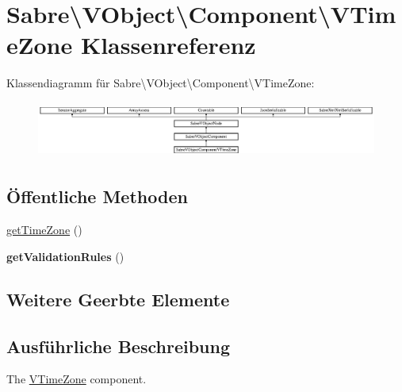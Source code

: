 \hypertarget{class_sabre_1_1_v_object_1_1_component_1_1_v_time_zone}{}\section{Sabre\textbackslash{}V\+Object\textbackslash{}Component\textbackslash{}V\+Time\+Zone Klassenreferenz}
\label{class_sabre_1_1_v_object_1_1_component_1_1_v_time_zone}
Klassendiagramm für Sabre\textbackslash{}V\+Object\textbackslash{}Component\textbackslash{}V\+Time\+Zone\+:\begin{figure}[H]
\begin{center}
\leavevmode
\includegraphics[height=1.866667cm]{class_sabre_1_1_v_object_1_1_component_1_1_v_time_zone}
\end{center}
\end{figure}
\subsection*{Öffentliche Methoden}
\begin{DoxyCompactItemize}
\item 
\mbox{\hyperlink{class_sabre_1_1_v_object_1_1_component_1_1_v_time_zone_a86124647028fa220acf46e371b1f9cd8}{get\+Time\+Zone}} ()
\item 
\mbox{\label{class_sabre_1_1_v_object_1_1_component_1_1_v_time_zone_a609f9d718b4802c467bce4b1cdfdeb54}} 
{\bfseries get\+Validation\+Rules} ()
\end{DoxyCompactItemize}
\subsection*{Weitere Geerbte Elemente}


\subsection{Ausführliche Beschreibung}
The \mbox{\hyperlink{class_sabre_1_1_v_object_1_1_component_1_1_v_time_zone}{V\+Time\+Zone}} component.

